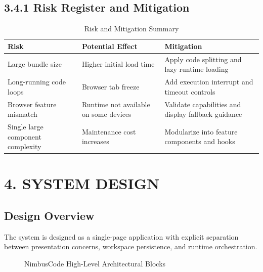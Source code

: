 \subsection*{3.4.1 Risk Register and Mitigation}
\begin{table}[H]
\centering
\caption{Risk and Mitigation Summary}
\begin{tabular}{p{3.5cm}p{6.0cm}p{3.3cm}}
\toprule
\textbf{Risk} & \textbf{Potential Effect} & \textbf{Mitigation} \\
\midrule
Large bundle size & Higher initial load time & Apply code splitting and lazy runtime loading \\
Long-running code loops & Browser tab freeze & Add execution interrupt and timeout controls \\
Browser feature mismatch & Runtime not available on some devices & Validate capabilities and display fallback guidance \\
Single large component complexity & Maintenance cost increases & Modularize into feature components and hooks \\
\bottomrule
\end{tabular}
\end{table}

\newpage
\section{4. SYSTEM DESIGN}

\subsection*{Design Overview}
The system is designed as a single-page application with explicit separation between presentation concerns, workspace persistence, and runtime orchestration.

\begin{figure}[H]
\centering
{}
\caption{NimbusCode High-Level Architectural Blocks}
\end{figure}

